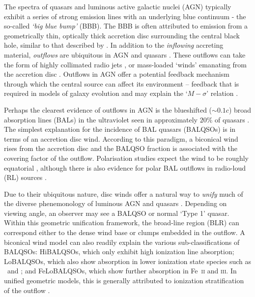 \documentclass[useAMS,usenatbib]{mn2e_x}
\begin{document}
The spectra of 
quasars and luminous active galactic nuclei (AGN) 
typically exhibit a series of strong emission lines
with an underlying blue continuum - the so-called {\sl `big blue bump'} (BBB). 
The BBB is often attributed to emission from a 
geometrically thin, optically thick accretion disc surrounding the central black hole, similar
to that described by \cite{shakurasunyaev1973}.
In addition to the {\em inflowing} accreting material, 
{\em outflows} are ubiquitous in AGN
and quasars \citep{kellerman1989,ganguly2008}. These outflows can take the form of 
highly collimated radio jets \citep[e.g.][]{hazard1963,potash1980,perley1984,marscher2006}, 
or mass-loaded `winds' emanating from the accretion disc 
\citep{weymann1991,turnermiller2009}. 
Outflows in AGN offer a 
potential feedback mechanism through which the central source can 
affect its environment \citep{king2003,king2005,fabian2012}
-- feedback that is required in models of galaxy evolution \citep{springel2005}
and may explain the `$M-\sigma$' relation \citep{silkrees1998,haring2004}.

Perhaps the clearest evidence of outflows in AGN is  
the blueshifted ($\sim 0.1c$) broad absorption lines (BALs) in the 
ultraviolet seen in approximately $20\%$ of quasars
\citep{weymann1991, reichard2003, knigge2008, turnermiller2009, allen2011}.
The simplest explanation for the incidence of 
BAL quasars (BALQSOs) is in terms of an accretion disc wind. 
According to this paradigm, a biconical wind rises from 
the accretion disc and the BALQSO fraction is associated with
the covering factor of the outflow. 
Polarisation studies expect the wind to be roughly equatorial
\citep{goodrich1995, cohen1995}, although there is also evidence
for polar BAL outflows  in radio-loud (RL) sources \citep{zhou2006,ghoshpunsly2007}.

Due to their ubiquitous nature,
disc winds offer a natural way to {\em unify} much of the
diverse phenemonology of luminous AGN and quasars \citep[e.g.][]{MCGV95, elvis2000}. 
Depending on viewing angle, an observer 
may see a BALQSO or normal `Type 1' quasar.
Within this geometric unification framework, the broad-line region (BLR) can 
correspond either to the dense wind base or clumps embedded
in the outflow. 
A biconical wind model can also readily explain the various sub-classifications of BALQSOs: 
HiBALQSOs, which only exhibit high ionization line absorption; LoBALQSOs, which also show
absorption in lower ionization state species such as \mg\ and \al; and
FeLoBALQSOs, which show further absorption in Fe~\textsc{ii} and \textsc{iii}.
In unified geometric models, this is generally attributed to ionization stratification
of the outflow \citep[e.g.][]{elvis2000}.
\end{document}
